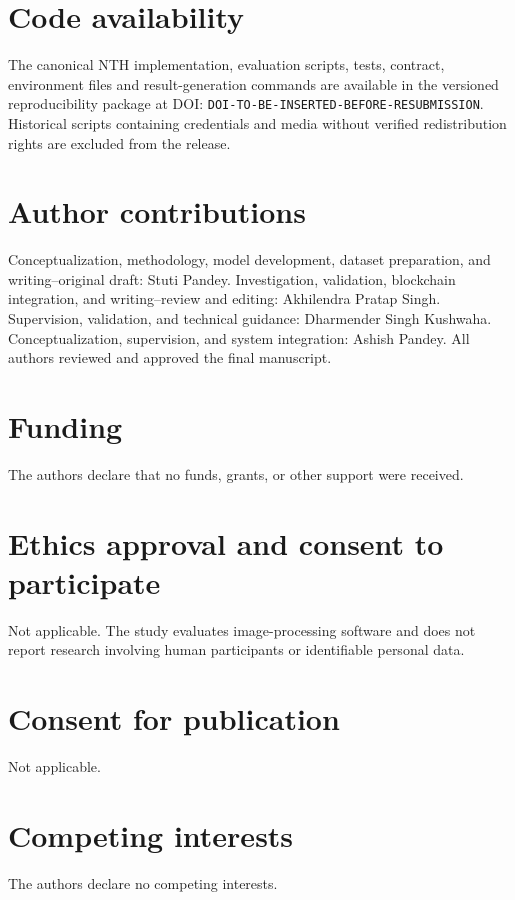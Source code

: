 \documentclass[12pt]{article}
\newcommand{\RepositoryDOI}{DOI-TO-BE-INSERTED-BEFORE-RESUBMISSION}
\begin{document}
\section*{Code availability}

The canonical NTH implementation, evaluation scripts, tests, contract, environment files and result-generation commands are available in the versioned reproducibility package at DOI: \texttt{\RepositoryDOI}. Historical scripts containing credentials and media without verified redistribution rights are excluded from the release.

\section*{Author contributions}

Conceptualization, methodology, model development, dataset preparation, and writing--original draft: Stuti Pandey. Investigation, validation, blockchain integration, and writing--review and editing: Akhilendra Pratap Singh. Supervision, validation, and technical guidance: Dharmender Singh Kushwaha. Conceptualization, supervision, and system integration: Ashish Pandey. All authors reviewed and approved the final manuscript.

\section*{Funding}

The authors declare that no funds, grants, or other support were received.

\section*{Ethics approval and consent to participate}

Not applicable. The study evaluates image-processing software and does not report research involving human participants or identifiable personal data.

\section*{Consent for publication}

Not applicable.

\section*{Competing interests}

The authors declare no competing interests.



\end{document}

